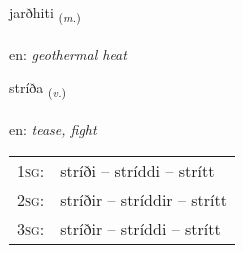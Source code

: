 \documentclass[frontgrid, backgrid]{flacards}\usepackage[]{graphicx}\usepackage[]{xcolor}
\begin{document}
\renewcommand{\flhead}{\vskip5pt \fboxsep=0pt {\small\bfseries\footnotesize Nafnorð | Noun}}
\renewcommand{\fcfoot}{\vskip5pt \fboxsep=0pt \hspace{2pt}{\small\bfseries\footnotesize 3K}}

\renewcommand{\blhead}{\vskip5pt {\small\bfseries\footnotesize Nafnorð | Noun }}
\renewcommand{\bcfoot}{\vskip5pt \hspace{2pt}{\small\bfseries\footnotesize 3K}}


{jarðhiti \small{\textsubscript{(\textit{m.})}} \\[1ex] %
\textphonetic{[jarθhɪtɪ]} \\
en: \emph{geothermal heat} \\  [2ex]
\renewcommand*{\arraystretch}{0.8}
}

\renewcommand{\flhead}{\vskip5pt \fboxsep=0pt {\small\bfseries\footnotesize Sagnorð | Verb}}
\renewcommand{\fcfoot}{\vskip5pt \fboxsep=0pt \hspace{2pt}{\small\bfseries\footnotesize 3K}}

\renewcommand{\blhead}{\vskip5pt {\small\bfseries\footnotesize Sagnorð | Verb }}
\renewcommand{\bcfoot}{\vskip5pt \hspace{2pt}{\small\bfseries\footnotesize 3K}}


{stríða \small{\textsubscript{(\textit{v.})}} \\[1ex] %
\textphonetic{[striːða]} \\
en: \emph{tease, fight} \\  [2ex]
\renewcommand*{\arraystretch}{0.8}
\begin{tabular}{p{1cm}l}
\textsc{1sg}: & stríði -- stríddi -- strítt \\ 
\textsc{2sg}: & stríðir -- stríddir -- strítt \\ 
\textsc{3sg}: & stríðir -- stríddi -- strítt \\ 
\end{tabular}
}
\end{document}
